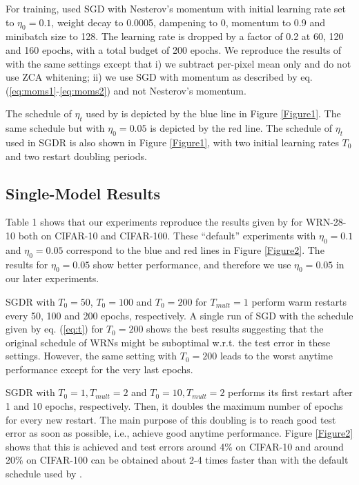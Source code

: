 \documentclass{article} %
\begin{document}
For training, \cite{zagoruyko2016wide} used SGD with Nesterov's momentum with initial learning rate set to $\eta_0=0.1$, weight decay to 0.0005, dampening to 0, momentum to 0.9
and minibatch size to 128. 
The learning rate is dropped by a factor of 0.2 at 60, 120 and 160 epochs, with a total budget of 200 epochs. We reproduce the results of \cite{zagoruyko2016wide} with the same settings except that i) we subtract per-pixel mean only and do not use ZCA whitening; ii) we use SGD with momentum as described by eq. (\ref{eq:moms1}-\ref{eq:moms2}) and not Nesterov's momentum. 



The schedule of $\eta_t$ used by \cite{zagoruyko2016wide} is depicted by the blue line in Figure \ref{Figure1}. The same schedule but with $\eta_0=0.05$ is depicted by the red line. 
The schedule of $\eta_t$ used in SGDR is also shown in Figure \ref{Figure1}, with two initial learning rates $T_0$ and two restart doubling periods.

\subsection{Single-Model Results}



Table 1 shows that our experiments reproduce the results given by \cite{zagoruyko2016wide} for WRN-28-10 both on CIFAR-10 and CIFAR-100. These ``default'' experiments 
with $\eta_0=0.1$ and $\eta_0=0.05$ correspond to the blue and red lines in Figure \ref{Figure2}. The results for $\eta_0=0.05$ show better performance, and therefore we use $\eta_0=0.05$ in our later experiments. 

SGDR with $T_0=50$, $T_0=100$ and $T_0=200$ for $T_{mult}=1$   
perform warm restarts every 50, 100 and 200 epochs, respectively. 
 A single run of SGD with the schedule given by eq. (\ref{eq:t}) for $T_0=200$ 
shows the best results suggesting that the original schedule of WRNs 
might be suboptimal w.r.t. the test error in these settings. 
However, the same setting with $T_0=200$ leads to the worst anytime performance except for the very last epochs.  

SGDR with $T_0=1, T_{mult}=2$ and $T_0=10, T_{mult}=2$ 
performs its first restart after 1 and 10 epochs, respectively. 
Then, it doubles the maximum number of epochs for every new restart. 
The main purpose of this doubling is to reach good test error 
as soon as possible, i.e., achieve good anytime performance.   
Figure \ref{Figure2} shows that this is achieved and 
test errors around 4\% on CIFAR-10 and around 20\% on CIFAR-100 
can be obtained about 2-4 times faster than with the default 
schedule used by \cite{zagoruyko2016wide}. 
\end{document}

